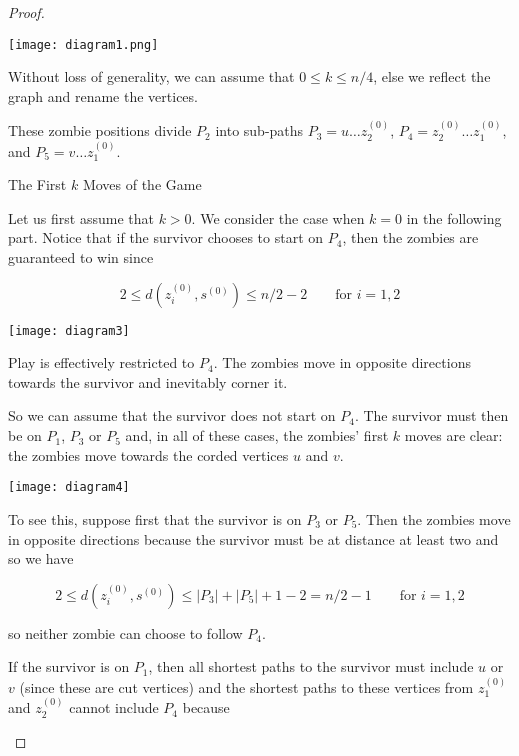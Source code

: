 \documentclass[letterpaper, 10pt]{article}
\begin{document}
\begin{proof}
\begin{proofpart}
\begin{center}
\texttt{[image: diagram1.png]}
\end{center}

Without loss of generality, we can assume that $0 \leq k \leq n/4$,
else we reflect the graph and rename the vertices.

These zombie positions divide $P_2$ into sub-paths $P_3 = u \dots z_2^{(0)}$,
$P_4 = z_2^{(0)} \dots z_1^{(0)}$, and
$P_5 = v \dots z_1^{(0)}$.
\end{proofpart}

\begin{proofpart} The First $k$ Moves of the Game

Let us first assume that $k>0$. We consider the case when $k=0$ in the following part.
Notice that if the survivor chooses to start on $P_4$, then the zombies are guaranteed to win
since

\[ 2 \leq d(z_i^{(0)}, s^{(0)}) \leq n/2 - 2 \qquad \text{for $i = 1,2$} \]

\begin{center}
\texttt{[image: diagram3]}
\end{center}

Play is effectively restricted to $P_4$. The zombies
move in opposite directions towards the survivor and inevitably corner it.

So we can assume that the survivor does not start on $P_4$. The survivor must
then be on $P_1$, $P_3$ or $P_5$ and, in all of these cases, the zombies' first $k$
moves are clear: the zombies move towards the corded vertices $u$ and $v$.

\begin{center}
\texttt{[image: diagram4]}
\end{center}

To see this, suppose first that the survivor is on $P_3$ or $P_5$. Then the zombies move in opposite directions
because the survivor must be at distance at least two and so we have

\[ 2 \leq d(z_i^{(0)}, s^{(0)}) \leq |P_3| + |P_5| +1 -2 = n/2 - 1 \qquad \text{for $i = 1,2$} \]

so neither zombie can choose to follow $P_4$.

If the survivor is on $P_1$, then all shortest paths to the survivor must
include $u$ or $v$ (since these are cut vertices)
and the shortest paths to these vertices from $z_1^{(0)}$
and $z_2^{(0)}$ cannot include $P_4$ because


\end{proofpart}
\end{proof}
\end{document}
